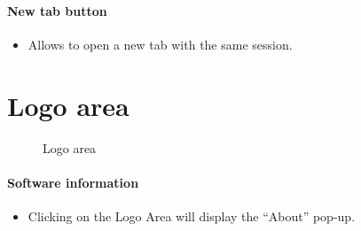 \documentclass[letterpaper,10pt,english]{sphinxmanual}
\begin{document}
\paragraph{New tab button}
\begin{itemize}
\item {} 
Allows to open a new tab with the same session.

\end{itemize}
\begin{figure}[htbp]
\centering

\end{figure}
\newpage

\section{Logo area}
\label{Gui:logo-area}\begin{figure}[htbp]
\centering
\capstart

\caption{Logo area}\end{figure}
\paragraph{Software information}
\begin{itemize}
\item {} 
Clicking on the Logo Area will display the “About” pop-up.

\end{itemize}
\begin{figure}[htbp]
\centering

\end{figure}
\end{document}
